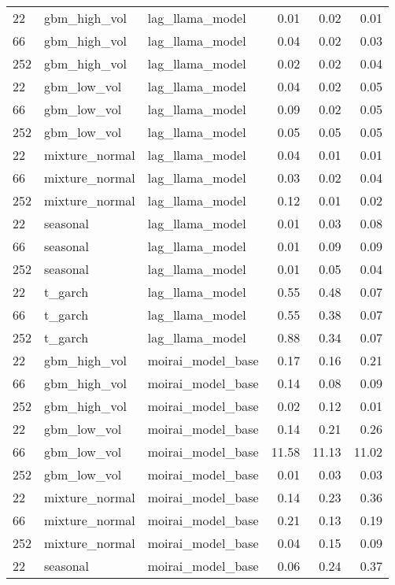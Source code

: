 {\begin{tabular}{lllrrr}
\midrule
22 & gbm\_high\_vol & lag\_llama\_model & 0.01 & 0.02 & 0.01 \\
66 & gbm\_high\_vol & lag\_llama\_model & 0.04 & 0.02 & 0.03 \\
252 & gbm\_high\_vol & lag\_llama\_model & 0.02 & 0.02 & 0.04 \\
\midrule
22 & gbm\_low\_vol & lag\_llama\_model & 0.04 & 0.02 & 0.05 \\
66 & gbm\_low\_vol & lag\_llama\_model & 0.09 & 0.02 & 0.05 \\
252 & gbm\_low\_vol & lag\_llama\_model & 0.05 & 0.05 & 0.05 \\
\midrule
22 & mixture\_normal & lag\_llama\_model & 0.04 & 0.01 & 0.01 \\
66 & mixture\_normal & lag\_llama\_model & 0.03 & 0.02 & 0.04 \\
252 & mixture\_normal & lag\_llama\_model & 0.12 & 0.01 & 0.02 \\
\midrule
22 & seasonal & lag\_llama\_model & 0.01 & 0.03 & 0.08 \\
66 & seasonal & lag\_llama\_model & 0.01 & 0.09 & 0.09 \\
252 & seasonal & lag\_llama\_model & 0.01 & 0.05 & 0.04 \\
\midrule
22 & t\_garch & lag\_llama\_model & 0.55 & 0.48 & 0.07 \\
66 & t\_garch & lag\_llama\_model & 0.55 & 0.38 & 0.07 \\
252 & t\_garch & lag\_llama\_model & 0.88 & 0.34 & 0.07 \\
\midrule
22 & gbm\_high\_vol & moirai\_model\_base & 0.17 & 0.16 & 0.21 \\
66 & gbm\_high\_vol & moirai\_model\_base & 0.14 & 0.08 & 0.09 \\
252 & gbm\_high\_vol & moirai\_model\_base & 0.02 & 0.12 & 0.01 \\
\midrule
22 & gbm\_low\_vol & moirai\_model\_base & 0.14 & 0.21 & 0.26 \\
66 & gbm\_low\_vol & moirai\_model\_base & 11.58 & 11.13 & 11.02 \\
252 & gbm\_low\_vol & moirai\_model\_base & 0.01 & 0.03 & 0.03 \\
\midrule
22 & mixture\_normal & moirai\_model\_base & 0.14 & 0.23 & 0.36 \\
66 & mixture\_normal & moirai\_model\_base & 0.21 & 0.13 & 0.19 \\
252 & mixture\_normal & moirai\_model\_base & 0.04 & 0.15 & 0.09 \\
\midrule
22 & seasonal & moirai\_model\_base & 0.06 & 0.24 & 0.37 \\

\end{tabular}}
